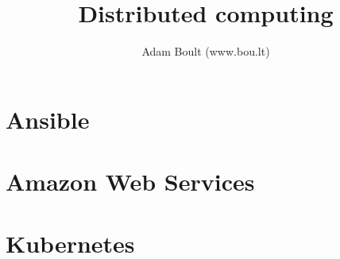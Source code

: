 \documentclass[oneside]{book}
\begin{document}
\author{Adam Boult (www.bou.lt)}
\title{Distributed computing}
\maketitle

\setcounter{tocdepth}{0}
\tableofcontents



\part{Ansible}


\part{Amazon Web Services}


\part{Kubernetes}

\end{document}

